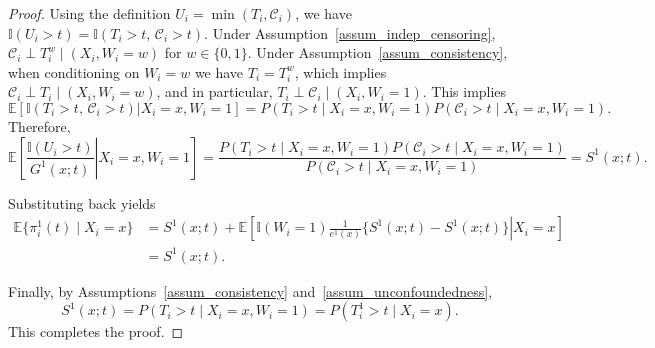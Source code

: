 \documentclass{article}
\newenvironment{proofof}[1]
{\renewcommand{\proofname}{Proof of #1}\begin{proof}}
{\end{proof}}
\begin{document}
\begin{proofof} {Theorem~\ref{thm:ID}:}
Using the definition $U_i = \min(T_i, \mathcal C_i)$, we have
$\mathbb{I}(U_i > t) = \mathbb{I}(T_i > t,\, \mathcal C_i > t)$.
Under Assumption~\ref{assum_indep_censoring},
 $\mathcal C_i \perp T_i^w \mid (X_i, W_i=w)$ for $w\in\{0,1\}$.
Under Assumption~\ref{assum_consistency}, when conditioning on $W_i=w$ we have
$T_i = T_i^w$, which implies $\mathcal C_i \perp T_i \mid (X_i, W_i=w)$, and  in particular,
$T_i \perp \mathcal C_i \mid (X_i, W_i = 1)$. This implies
\[
\mathbb{E}\!\left[
\left.
\mathbb{I}(T_i > t,\, \mathcal C_i > t)
\right| X_i = x, W_i = 1
\right]
=
P(T_i > t \mid X_i = x, W_i = 1)
P(\mathcal C_i > t \mid X_i = x, W_i = 1).
\]
Therefore,
\[
\mathbb{E}\!\left[
\left.
\frac{\mathbb{I}(U_i > t)}{G^1(x;t)}
\right| X_i = x, W_i = 1
\right]
=
\frac{
P(T_i > t \mid X_i = x, W_i = 1)
P(\mathcal C_i > t \mid X_i = x, W_i = 1)
}{
P(\mathcal C_i > t \mid X_i = x, W_i = 1)
}
=
S^1(x;t).
\]

Substituting back yields
\begin{align*}
\mathbb{E}\{\pi_i^1(t) \mid X_i = x\}
&=
S^1(x;t)
+
\mathbb{E}\!\left[
\left.
\mathbb{I}(W_i = 1)
\frac{1}{e^1(x)}
\bigl\{ S^1(x;t) - S^1(x;t) \bigr\}
\right| X_i = x
\right] \\
&=
S^1(x;t).
\end{align*}

Finally, by Assumptions~\ref{assum_consistency} and~\ref{assum_unconfoundedness},
\[
S^1(x;t)
=
P(T_i > t \mid X_i = x, W_i = 1)
=
P(T_i^1 > t \mid X_i = x).
\]
This completes the proof.
\end{proofof}
\end{document}
